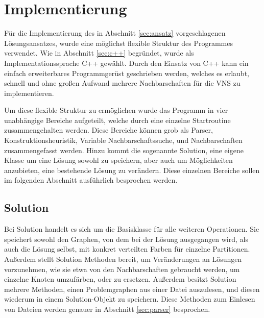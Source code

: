 \chapter{Implementierung}
Für die Implementierung des in Abschnitt \ref{sec:ansatz} vorgeschlagenen Lösungsansatzes, wurde eine möglichst flexible Struktur des Programmes verwendet. Wie in Abschnitt \ref{sec:c++} begründet, wurde
als Implementationssprache C++ gewählt. Durch den Einsatz von C++ kann ein einfach erweiterbares Programmgerüst geschrieben werden, welches es erlaubt, schnell und ohne großen Aufwand mehrere Nachbarschaften
für die VNS zu implementieren. 

Um diese flexible Struktur zu ermöglichen wurde das Programm in vier unabhängige Bereiche aufgeteilt, welche durch eine einzelne Startroutine zusammengehalten werden. Diese Bereiche können grob als Parser, 
Konstruktionsheuristik, Variable Nachbarschaftssuche, und Nachbarschaften zusammengefasst werden. Hinzu kommt die sogenannte Solution, eine eigene Klasse um eine Lösung sowohl zu speichern, aber auch um Möglichkeiten
anzubieten, eine bestehende Lösung zu verändern. Diese einzelnen Bereiche sollen im folgenden Abschnitt ausführlich besprochen werden.

\section{Solution}
Bei Solution handelt es sich um die Basisklasse für alle weiteren Operationen. Sie speichert sowohl den Graphen, von dem bei der Lösung ausgegangen wird, als auch die Lösung selbst, mit konkret verteilten Farben
für einzelne Partitionen. Außerdem stellt Solution Methoden bereit, um Veränderungen an Lösungen vorzunehmen, wie sie etwa von den Nachbarschaften gebraucht werden, um einzelne Knoten umzufärben, oder zu ersetzen.
Außerdem besitzt Solution mehrere Methoden, einen Problemgraphen aus einer Datei auszulesen, und diesen wiederum in einem Solution-Objekt zu speichern. Diese Methoden zum Einlesen von Dateien werden genauer 
in Abschnitt \ref{sec:parser} besprochen.

